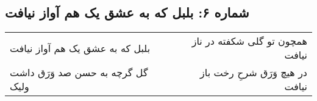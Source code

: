 \begin{center}
\section*{شماره ۶: بلبل که به عشق یک هم آواز نیافت}
\label{sec:006}
\begin{longtable}{l p{0.5cm} r}
بلبل که به عشق یک هم آواز نیافت
&&
همچون تو گلی شکفته در ناز نیافت
\\
گل گرچه به حسن صد وَرَق داشت ولیک
&&
در هیچ وَرَق شرحِ رخت باز نیافت
\\
\end{longtable}
\end{center}
